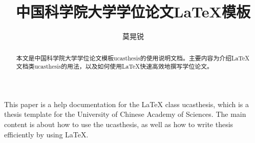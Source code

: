   \confidential{}%
  \title[国科大学位论文\LaTeX{}模板]{中国科学院大学学位论文\LaTeX{}模板}%
  \author{莫晃锐}%
\maketitle
\makeenglishtitle
\makedeclaration
\begin{abstract}%
本文是中国科学院大学学位论文模板ucasthesis的使用说明文档。主要内容为介绍\LaTeX{}文档类ucasthesis的用法，以及如何使用\LaTeX{}快速高效地撰写学位论文。

\end{abstract}


\begin{englishabstract}%
This paper is a help documentation for the \LaTeX{} class ucasthesis, which is  a thesis template for the University of Chinese Academy of Sciences. The main content is about how to use the ucasthesis, as well as how to write thesis efficiently by using \LaTeX{}.

\end{englishabstract}
